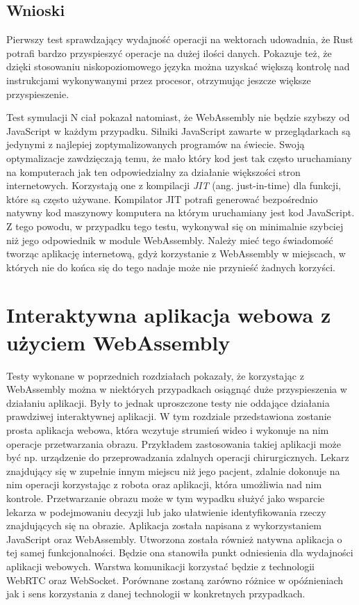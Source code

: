 \documentclass[language=polish,type=master]{aghmodern}
\begin{document}
\section{Wnioski}
Pierwszy test sprawdzający wydajność operacji na wektorach udowadnia, że Rust potrafi bardzo przyspieszyć operacje na dużej ilości danych.
Pokazuje też, że dzięki stosowaniu niskopoziomowego języka można uzyskać większą kontrolę nad instrukcjami wykonywanymi przez procesor, otrzymując jeszcze większe przyspieszenie.

Test symulacji N ciał pokazał natomiast, że WebAssembly nie będzie szybszy od JavaScript w każdym przypadku.
Silniki JavaScript zawarte w przeglądarkach są jedynymi z najlepiej zoptymalizowanych programów na świecie.
Swoją optymalizacje zawdzięczają temu, że mało który kod jest tak często uruchamiany na komputerach jak ten odpowiedzialny za działanie większości stron internetowych.
Korzystają one z kompilacji \emph{JIT}\footnotemark{} (ang. just-in-time) dla funkcji, które są często używane.
Kompilator JIT potrafi generować bezpośrednio natywny kod maszynowy komputera na którym uruchamiany jest kod JavaScript.
Z tego powodu, w przypadku tego testu, wykonywał się on minimalnie szybciej niż jego odpowiednik w module WebAssembly.
Należy mieć tego świadomość tworząc aplikację internetową, gdyż korzystanie z WebAssembly w miejscach, w których nie do końca się do tego nadaje może nie przynieść żadnych korzyści.

\chapter{Interaktywna aplikacja webowa z użyciem WebAssembly}
Testy wykonane w poprzednich rozdziałach pokazały, że korzystając z WebAssembly można w niektórych przypadkach osiągnąć duże przyspieszenia w działaniu aplikacji.
Były to jednak uproszczone testy nie oddające działania prawdziwej interaktywnej aplikacji.
W tym rozdziale przedstawiona zostanie prosta aplikacja webowa, która wczytuje strumień wideo i wykonuje na nim operacje przetwarzania obrazu.
Przykładem zastosowania takiej aplikacji może być np. urządzenie do przeprowadzania zdalnych operacji chirurgicznych.
Lekarz znajdujący się w zupełnie innym miejscu niż jego pacjent, zdalnie dokonuje na nim operacji korzystając z robota oraz aplikacji, która umożliwia nad nim kontrole.
Przetwarzanie obrazu może w tym wypadku służyć jako wsparcie lekarza w podejmowaniu decyzji lub jako ułatwienie identyfikowania rzeczy znajdujących się na obrazie.
Aplikacja została napisana z wykorzystaniem JavaScript oraz WebAssembly.
Utworzona została również natywna aplikacja o tej samej funkcjonalności.
Będzie ona stanowiła punkt odniesienia dla wydajności aplikacji webowych.
Warstwa komunikacji korzystać będzie z technologii WebRTC oraz WebSocket.
Porównane zostaną zarówno różnice w opóźnieniach jak i sens korzystania z danej technologii w konkretnych przypadkach.
\end{document}
